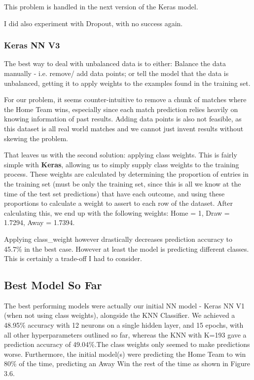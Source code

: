 \documentclass[12pt,a4paper,twoside,openright]{report}
\begin{document}
This problem is handled in the next version of the Keras model.

I did also experiment with Dropout, with no success again.

\subsubsection{Keras NN V3}

The best way to deal with unbalanced data is to either: Balance the data manually - i.e. remove/ add data points; or tell the model that the data is unbalanced, getting it to apply weights to the examples found in the training set.

For our problem, it seems counter-intuitive to remove a chunk of matches where the Home Team wins, especially since each match prediction relies heavily on knowing information of past results. Adding data points is also not feasible, as this dataset is all real world matches and we cannot just invent results without skewing the problem.

That leaves us with the second solution: applying class weights. This is fairly simple with \textbf{Keras}, allowing us to simply supply class weights to the training process. These weights are calculated by determining the proportion of entries in the training set (must be only the training set, since this is all we know at the time of the test set predictions) that have each outcome, and using these proportions to calculate a weight to assert to each row of the dataset. After calculating this, we end up with the following weights: Home = 1, Draw = 1.7294, Away = 1.7394.

Applying class\_weight however drastically decreases prediction accuracy to 45.7\% in the best case. However at least the model is predicting different classes. This is certainly a trade-off I had to consider.

\subsection{Best Model So Far}

The best performing models were actually our initial NN model - Keras NN V1 (when not using class weights), alongside the KNN Classifier. We achieved a 48.95\% accuracy with 12 neurons on a single hidden layer, and 15 epochs, with all other hyperparameters outlined so far, whereas the KNN with K=193 gave a prediction accuracy of 49.04\%.The class weights only seemed to make predictions worse. Furthermore, the initial model(s) were predicting the Home Team to win 80\% of the time, predicting an Away Win the rest of the time as shown in Figure 3.6.
\end{document}
